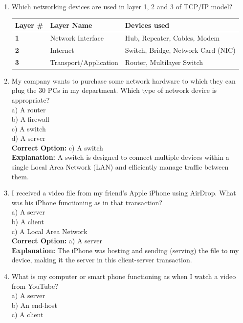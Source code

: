 \documentclass[a4paper,12pt]{article}
\begin{document}
\begin{enumerate}
    \item Which networking devices are used in layer 1, 2 and 3 of TCP/IP model?\\
    \begin{center}
    \begin{tabular}{|l|l|l|}
        \hline
        \textbf{Layer \#} & \textbf{Layer Name} & \textbf{Devices used} \\
        \hline
        \textbf{1} & Network Interface & Hub, Repeater, Cables, Modem \\
        \hline
        \textbf{2} & Internet & Switch, Bridge, Network Card (NIC) \\
        \hline
        \textbf{3} & Transport/Application & Router, Multilayer Switch \\
        \hline
    \end{tabular}
    \end{center}

    \item My company wants to purchase some network hardware to which they can plug the 30 PCs in my department. Which type of network device is appropriate?\\
    a) A router\\
    b) A firewall\\
    c) A switch\\
    d) A server\\

    \textbf{Correct Option:} c) A switch\\
    \textbf{Explanation:} A switch is designed to connect multiple devices within a single Local Area Network (LAN) and efficiently manage traffic between them.\\

    \item I received a video file from my friend's Apple iPhone using AirDrop. What was his iPhone functioning as in that transaction?\\
    a) A server\\
    b) A client\\
    c) A Local Area Network\\

    \textbf{Correct Option:} a) A server\\
    \textbf{Explanation:} The iPhone was hosting and sending (serving) the file to my device, making it the server in this client-server transaction.\\

    \item What is my computer or smart phone functioning as when I watch a video from YouTube?\\
    a) A server\\
    b) An end-host\\
    c) A client\\


\end{enumerate}
\end{document}
